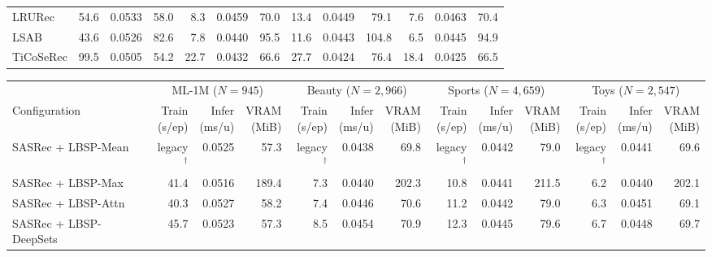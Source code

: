 \begin{table}[!htbp]
\begin{tabular*}{\textwidth}{@{\extracolsep{\fill}}lrrrrrrrrrrrr@{}}
LRURec & 54.6 & 0.0533 & 58.0 & 8.3 & 0.0459 & 70.0 & 13.4 & 0.0449 & 79.1 & 7.6 & 0.0463 & 70.4 \\
LSAB & 43.6 & 0.0526 & 82.6 & 7.8 & 0.0440 & 95.5 & 11.6 & 0.0443 & 104.8 & 6.5 & 0.0445 & 94.9 \\
TiCoSeRec & 99.5 & 0.0505 & 54.2 & 22.7 & 0.0432 & 66.6 & 27.7 & 0.0424 & 76.4 & 18.4 & 0.0425 & 66.5 \\
\bottomrule
\end{tabular*}
\par\smallskip\noindent{}\par\smallskip
\noindent\begin{tabular*}{\textwidth}{@{\extracolsep{\fill}}lrrrrrrrrrrrr@{}}
\toprule
 & \multicolumn{3}{c}{ML-1M ($N{=}945$)} & \multicolumn{3}{c}{Beauty ($N{=}2{,}966$)} & \multicolumn{3}{c}{Sports ($N{=}4{,}659$)} & \multicolumn{3}{c}{Toys ($N{=}2{,}547$)} \\
\cmidrule(lr){2-4}\cmidrule(lr){5-7}\cmidrule(lr){8-10}\cmidrule(lr){11-13}
Configuration & \shortstack{Train\\(s/ep)} & \shortstack{Infer\\(ms/u)} & \shortstack{VRAM\\(MiB)} & \shortstack{Train\\(s/ep)} & \shortstack{Infer\\(ms/u)} & \shortstack{VRAM\\(MiB)} & \shortstack{Train\\(s/ep)} & \shortstack{Infer\\(ms/u)} & \shortstack{VRAM\\(MiB)} & \shortstack{Train\\(s/ep)} & \shortstack{Infer\\(ms/u)} & \shortstack{VRAM\\(MiB)} \\
\midrule
SASRec + LBSP-Mean & legacy$^{\dagger}$ & 0.0525 & 57.3 & legacy$^{\dagger}$ & 0.0438 & 69.8 & legacy$^{\dagger}$ & 0.0442 & 79.0 & legacy$^{\dagger}$ & 0.0441 & 69.6 \\
SASRec + LBSP-Max & 41.4 & 0.0516 & 189.4 & 7.3 & 0.0440 & 202.3 & 10.8 & 0.0441 & 211.5 & 6.2 & 0.0440 & 202.1 \\
SASRec + LBSP-Attn & 40.3 & 0.0527 & 58.2 & 7.4 & 0.0446 & 70.6 & 11.2 & 0.0442 & 79.0 & 6.3 & 0.0451 & 69.1 \\
SASRec + LBSP-DeepSets & 45.7 & 0.0523 & 57.3 & 8.5 & 0.0454 & 70.9 & 12.3 & 0.0445 & 79.6 & 6.7 & 0.0448 & 69.7 \\

\end{tabular*}
\end{table}
